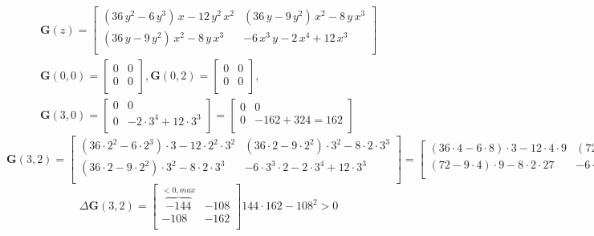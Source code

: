 \documentclass[../rgr1.tex]{subfiles}
\begin{document}
\begin{align}
	\mathbf{G}(z) =
	\begin{bmatrix}
		\left(36\,{y}^{2}-6\,{y}^{3}\right)\,x-12\,{y}^{2}\,{x}^{2} & 	\left(36\,y-9\,{y}^{2}\right)\,{x}^{2}-8\,y\,{x}^{3} \\
		\left(36\,y-9\,{y}^{2}\right)\,{x}^{2}-8\,y\,{x}^{3} & -6\,{x}^{3}\,y-2\,{x}^{4}+12\,{x}^{3} \\
	\end{bmatrix}\\
	\mathbf{G}(0,0) =
	\begin{bmatrix}
		0 & 0 \\
		0 & 0 \\
	\end{bmatrix},
	\mathbf{G}(0,2) =
	\begin{bmatrix}
		0 & 0 \\
		0 & 0 \\
	\end{bmatrix},\\
	\mathbf{G}(3,0) =
	\begin{bmatrix}
		0 & 0 \\
		0 & -2\cdot 3^4+12\cdot 3^3 \\
	\end{bmatrix} =
	\begin{bmatrix}
		0 & 0 \\
		0 & -162+324=162 \\
	\end{bmatrix}
\end{align}
\begin{dmath}
	\mathbf{G}(3,2) =
	\begin{bmatrix}
		(36\cdot 2^2-6\cdot 2^3)\cdot 3-12\cdot 2^2\cdot 3^2 & (36\cdot 2-9\cdot 2^2)\cdot 3^2-8\cdot 2\cdot 3^3 \\
		(36\cdot 2-9\cdot 2^2)\cdot 3^2-8\cdot 2\cdot 3^3 & -6\cdot 3^3\cdot 2-2\cdot 3^4+12\cdot 3^3 \\
	\end{bmatrix} =
	\begin{bmatrix}
		(36\cdot 4-6\cdot 8)\cdot 3-12\cdot 4\cdot 9 & (72-9\cdot 4)\cdot 9-8\cdot 2\cdot 27 \\
		(72-9\cdot 4)\cdot 9-8\cdot 2\cdot 27 & -6\cdot 27\cdot 2-2\cdot 81+12\cdot 27 \\
	\end{bmatrix}
\end{dmath}
\begin{equation}
	\Delta\mathbf{G}(3,2) =
	\begin{bmatrix}
		\overbrace{-144}^{<0, max} & -108 \\
		-108 & -162 \\
	\end{bmatrix}
	144\cdot 162-108^2 > 0
\end{equation}

\end{document}
